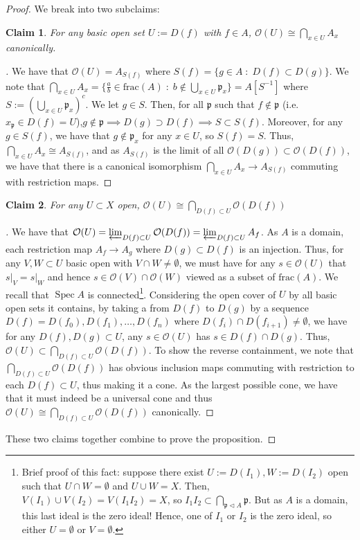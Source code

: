 \documentclass[english]{article}
\newcommand{\evat}[3]{\left. #1\right|_{#2}^{#3}}
\DeclareMathOperator{\spec}{Spec}
\newcommand{\OO}{\mathcal{O}}
\newcommand{\pfr}{\mathfrak{p}}
\newenvironment{subproof}[1][\proofname]{%
	\renewcommand{\qedsymbol}{$\blacksquare$}%
	\begin{proof}[#1]%
	}{%
	\end{proof}%
}
\newtheorem*{claim*}{Claim}
\theoremstyle{remark}
\theoremstyle{definition}
\newcommand{\clim}{\varprojlim}
\newcommand{\restr}[2]{\evat{#1}{#2}{}}
\begin{document}
\begin{proof}
	We break into two subclaims:
	\begin{claim*}
		For any \emph{basic} open set $U:=D(f)$ with $f\in A$, $\OO(U)\cong\bigcap_{x\in U}A_x$ canonically.
	\end{claim*}
\begin{subproof}
	We have that $\OO(U)=A_{S(f)}$ where $S(f)=\{g\in A\;:\;D(f)\subset D(g)\}$. We note that $\bigcap_{x\in U} A_x=\{\frac{a}{b}\in \mathrm{frac}(A)\;:\;b\notin \bigcup_{x\in U} \pfr_x\}=A[S^{-1}]$ where $S:=\left(\bigcup_{x\in U}\pfr_x\right)^c$. We let $g\in S$. Then, for all $\pfr$ such that $f\not \in \pfr$ (i.e. $x_\pfr\in D(f)=U$),$g\not \in \pfr\implies D(g)\supset D(f)\implies S\subset S(f)$. Moreover, for any $g\in S(f)$, we have that $g\notin \pfr_x$ for any $x\in U$, so $S(f)=S$. Thus, $\bigcap_{x\in U} A_x\cong A_{S(f)}$, and as $A_{S(f)}$ is the limit of all $\OO(D(g))\subset \OO(D(f))$, we have that there is a canonical isomorphism $\bigcap_{x\in U}A_x\to A_{S(f)}$ commuting with restriction maps.
\end{subproof}
\begin{claim*} For any $U\subset X$ open, $\OO(U)\cong\bigcap_{D(f)\subset U}\OO(D(f))$
	\end{claim*}
\begin{subproof}
	We have that $\OO(U)=\clim_{D(f)\subset U}\OO(D(f))=\clim_{D(f)\subset U}A_f$. As $A$ is a domain, each restriction map $A_f\to A_g$ where $D(g)\subset D(f)$ is an injection. Thus, for any $V,W\subset U$ basic open with $V\cap W\neq \emptyset$, we must have for any $s\in \OO(U)$ that $\restr{s}{V}=\restr{s}{W}$ and hence $s\in \OO(V)\cap \OO(W)$ viewed as a subset of $\mathrm{frac}(A)$. We recall that $\spec A$ is connected\footnote{Brief proof of this fact: suppose there exist $U:=D(I_1),W:=D(I_2)$ open such that $U\cap W=\emptyset$ and $U\cup W=X$. Then, $V(I_1)\cup V(I_2)=V(I_1I_2)=X$, so $I_1I_2\subset \bigcap_{\pfr\triangleleft A}\pfr$. But as $A$ is a domain, this last ideal is the zero ideal! Hence, one of $I_1$ or $I_2$ is the zero ideal, so either $U=\emptyset$ or $V=\emptyset$.}. Considering the open cover of $U$ by all basic open sets it contains, by taking a  from $D(f)$ to $D(g)$ by a sequence $D(f)=D(f_0),D(f_1),\hdots,D(f_n)$ where $D(f_i)\cap D(f_{i+1})\neq \emptyset$, we have for any $D(f),D(g)\subset U$, any $s\in \OO(U)$ has $s\in D(f)\cap D(g)$. Thus, $\OO(U)\subset \bigcap_{D(f)\subset U}\OO(D(f))$. To show the reverse containment, we note that $\bigcap_{D(f)\subset U}\OO(D(f))$ has obvious inclusion maps commuting with restriction to each $D(f)\subset U$, thus making it a cone. As the largest possible cone, we have that it must indeed be a universal cone and thus $\OO(U)\cong\bigcap_{D(f)\subset U}\OO(D(f))$ canonically.
\end{subproof}
These two claims together combine to prove the proposition.
\end{proof}
\end{document}
